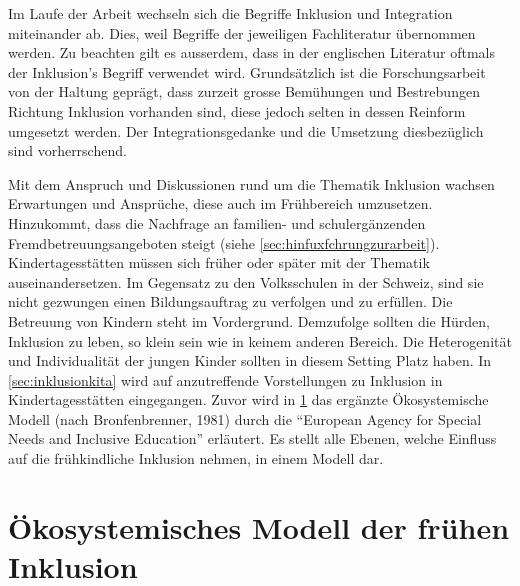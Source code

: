 \documentclass[
  ngerman,
  11pt,
  paper=a4,
  twoside,
  titlepage=true,
  openright,
  abstract=on,
  toc=listofnumbered,
  numbers=noenddot,
  chapterprefix=true,
  headings=optiontohead,
  svgnames,
  dvipsnames]{scrreprt}
\begin{document}
Im Laufe der Arbeit wechseln sich die Begriffe Inklusion und Integration
miteinander ab. Dies, weil Begriffe der jeweiligen Fachliteratur
übernommen werden. Zu beachten gilt es ausserdem, dass in der englischen
Literatur oftmals der Inklusion’s Begriff verwendet wird. Grundsätzlich
ist die Forschungsarbeit von der Haltung geprägt, dass zurzeit grosse
Bemühungen und Bestrebungen Richtung Inklusion vorhanden sind, diese
jedoch selten in dessen Reinform umgesetzt werden. Der
Integrationsgedanke und die Umsetzung diesbezüglich sind vorherrschend.

Mit dem Anspruch und Diskussionen rund um die Thematik Inklusion wachsen
Erwartungen und Ansprüche, diese auch im Frühbereich umzusetzen.
Hinzukommt, dass die Nachfrage an familien- und schulergänzenden
Fremdbetreuungsangeboten steigt (siehe
\cref{sec:hinfuxfchrungzurarbeit}). Kindertagesstätten müssen sich
früher oder später mit der Thematik auseinandersetzen. Im Gegensatz zu
den Volksschulen in der Schweiz, sind sie nicht gezwungen einen
Bildungsauftrag zu verfolgen und zu erfüllen. Die Betreuung von Kindern
steht im Vordergrund. Demzufolge sollten die Hürden, Inklusion zu leben,
so klein sein wie in keinem anderen Bereich. Die Heterogenität und
Individualität der jungen Kinder sollten in diesem Setting Platz haben.
In \cref{sec:inklusionkita} wird auf anzutreffende Vorstellungen zu
Inklusion in Kindertagesstätten eingegangen. Zuvor wird in
\cref{sec:oekosystemischesmodel} das ergänzte Ökosystemische Modell
(nach Bronfenbrenner, 1981) durch die “European Agency for Special Needs
and Inclusive Education” erläutert. Es stellt alle Ebenen, welche
Einfluss auf die frühkindliche Inklusion nehmen, in einem Modell dar.

\hypertarget{sec:oekosystemischesmodel}{%
\section{Ökosystemisches Modell der frühen
Inklusion}\label{sec:oekosystemischesmodel}}
\end{document}
